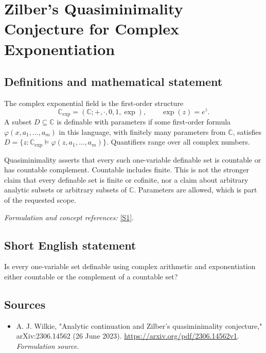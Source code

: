 \documentclass[11pt]{article}
\begin{document}
\section*{\texorpdfstring{Zilber’s Quasiminimality Conjecture for Complex Exponentiation}{Zilber’s Quasiminimality Conjecture for Complex Exponentiation}}\label{30005287}
\subsection{Definitions and mathematical statement}
The complex exponential field is the first-order structure
\[
 {\mathbb{C}}_{\exp}=({\mathbb{C}};+ ,\cdot,0,1,\exp),\qquad \exp(z)=e^z.
\]
A subset $D\subseteq{\mathbb{C}}$ is definable with parameters if some first-order formula $\varphi(x,a_1,\ldots,a_m)$ in this language, with finitely many parameters from ${\mathbb{C}}$, satisfies $D=\{z:{\mathbb{C}}_{\exp}\models\varphi(z,a_1,\ldots,a_m)\}$. Quantifiers range over all complex numbers.

Quasiminimality asserts that every such one-variable definable set is countable or has countable complement. Countable includes finite. This is not the stronger claim that every definable set is finite or cofinite, nor a claim about arbitrary analytic subsets or arbitrary subsets of ${\mathbb{C}}$. Parameters are allowed, which is part of the requested scope.
\par\smallskip\textit{Formulation and concept references:} \href{https://arxiv.org/pdf/2306.14562v1}{[S1]}.

\subsection{Short English statement}
Is every one-variable set definable using complex arithmetic and exponentiation either countable or the complement of a countable set?
\subsection{Sources}
\begin{itemize}
\item[S1]A. J. Wilkie, "Analytic continuation and Zilber's quasiminimality conjecture," arXiv:2306.14562 (26 June 2023).
\url{https://arxiv.org/pdf/2306.14562v1}.
\textit{Formulation source.}
\end{itemize}
\end{document}
